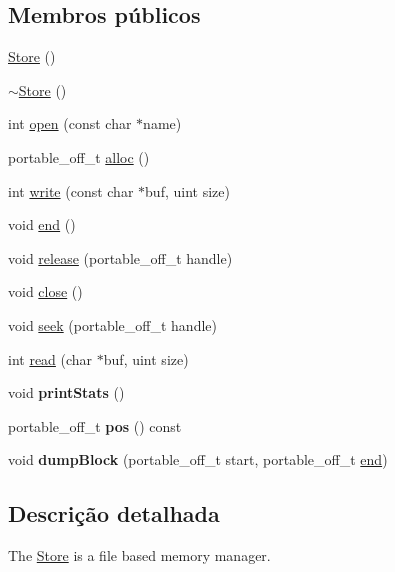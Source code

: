 \subsection*{Membros públicos}
\begin{DoxyCompactItemize}
\item 
\hyperlink{class_store_a9a4249b34504484d8738c818d7e08889}{Store} ()
\item 
\hyperlink{class_store_a27078c8f020fc9dc62f3149179df9bb6}{$\sim$\-Store} ()
\item 
int \hyperlink{class_store_a8e5d9452ebe946531a67beff71e1124b}{open} (const char $\ast$name)
\item 
portable\-\_\-off\-\_\-t \hyperlink{class_store_a673d6cf39dd2cf766bb97e8562d1d540}{alloc} ()
\item 
int \hyperlink{class_store_a92a061380ba3dac165ee1a5e92617a6a}{write} (const char $\ast$buf, uint size)
\item 
void \hyperlink{class_store_aaf81d3fdaf258088d7692fa70cece087}{end} ()
\item 
void \hyperlink{class_store_a41193e457f8f520f59bb34e1e436e8f2}{release} (portable\-\_\-off\-\_\-t handle)
\item 
void \hyperlink{class_store_a5ae591df94fc66ccb85cbb6565368bca}{close} ()
\item 
void \hyperlink{class_store_ae9e443b220168605260eeda592343ea5}{seek} (portable\-\_\-off\-\_\-t handle)
\item 
int \hyperlink{class_store_a8e47d0de1e7f98cc7af54d4f44e09186}{read} (char $\ast$buf, uint size)
\item 
\hypertarget{class_store_a0beecd7e864561c9474bc80e993556bf}{void {\bfseries print\-Stats} ()}\label{class_store_a0beecd7e864561c9474bc80e993556bf}

\item 
\hypertarget{class_store_ad860154660338efe86b35e546a28774c}{portable\-\_\-off\-\_\-t {\bfseries pos} () const }\label{class_store_ad860154660338efe86b35e546a28774c}

\item 
\hypertarget{class_store_af9d721341bd8a103b973f7fd6125f678}{void {\bfseries dump\-Block} (portable\-\_\-off\-\_\-t start, portable\-\_\-off\-\_\-t \hyperlink{class_store_aaf81d3fdaf258088d7692fa70cece087}{end})}\label{class_store_af9d721341bd8a103b973f7fd6125f678}

\end{DoxyCompactItemize}


\subsection{Descrição detalhada}
The \hyperlink{class_store}{Store} is a file based memory manager. 

